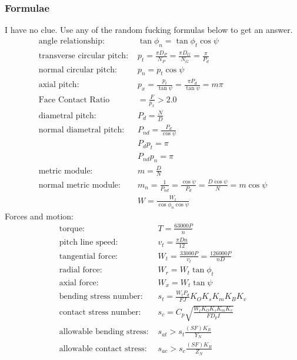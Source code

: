 \documentclass[11pt, fleqn]{article}
\begin{document}
\subsubsection{Formulae}
I have no clue. Use any of the random fucking formulas below to get an answer.
\begin{align*}
    \text{angle relationship: }&\tan\phi_n=\tan\phi_t\cos\psi\\
    \text{transverse circular pitch: }&p_t=\frac{\pi D_P}{N_P}=\frac{\pi D_G}{N_G}=\frac{\pi}{P_d}\\
    \text{normal circular pitch: }&p_n=p_t\cos\psi\\
    \text{axial pitch: }&p_x=\frac{p_t}{\tan\psi}=\frac{\pi P_d}{\tan\psi}=m\pi\\
    \text{Face Contact Ratio}&=\frac{F}{p_x}>2.0\\
    \text{diametral pitch: }&P_d=\frac{N}{D}\\
    \text{normal diametral pitch: }&P_{nd}=\frac{P_d}{\cos\psi}\\
    &P_dp_t=\pi\\
    &P_{nd}p_n=\pi\\
    \text{metric module: }&m=\frac{D}{N}\\
    \text{normal metric module: }&m_n=\frac{1}{P_{nd}}=\frac{\cos\psi}{P_d}=\frac{D\cos\psi}{N}=m\cos\psi\\
    &W=\frac{W_t}{\cos\phi_n\cos\psi}
\end{align*}
Forces and motion:
\begin{align*}
    \text{torque: }&T=\frac{63000P}{n}\\
    \text{pitch line speed: }&v_t=\frac{\pi Dn}{12}\\
    \text{tangential force: }&W_t=\frac{33000P}{v_t}=\frac{126000P}{nD}\\
    \text{radial force: }&W_r=W_t\tan\phi_t\\
    \text{axial force: }&W_x=W_t\tan\psi\\
    \text{bending stress number: }&s_t=\frac{W_tP_d}{FJ}K_OK_sK_mK_BK_v\\
    \text{contact stress number: }&s_c=C_p\sqrt{\frac{W_tK_OK_sK_mK_v}{FD_pI}}\\
    \text{allowable bending stress: }&s_{at}>s_t\frac{(SF)K_R}{Y_N}\\
    \text{allowable contact stress: }&s_{ac}>s_c\frac{(SF)K_R}{Z_N}
\end{align*}
\end{document}
